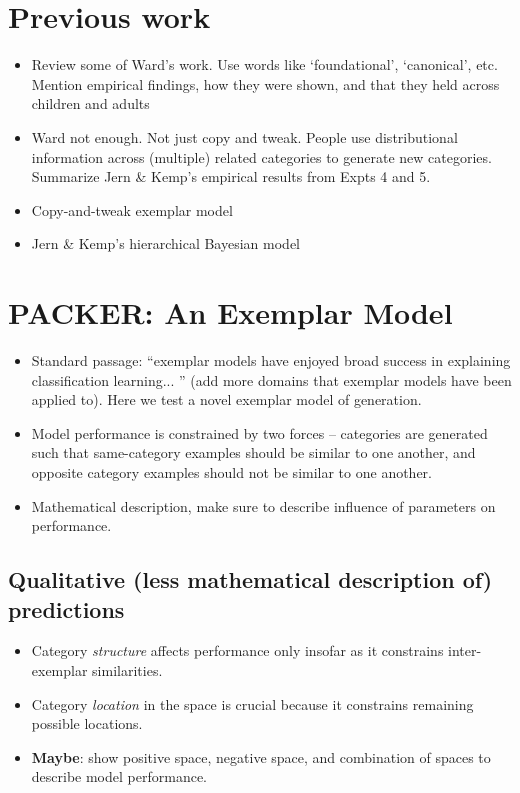 \documentclass[10pt,letterpaper]{article}
\begin{document}
\section{Previous work}
\begin{itemize}
\item Review some of Ward's work. Use words like `foundational', `canonical', etc. Mention empirical findings, how they were shown, and that they held across children and adults
\item Ward not enough. Not just copy and tweak. People use distributional information across (multiple) related categories to generate new categories. Summarize Jern \& Kemp's empirical results from Expts 4 and 5.
\item Copy-and-tweak exemplar model 
\item Jern \& Kemp's hierarchical Bayesian model
\end{itemize}

\section{PACKER: An Exemplar Model}
\begin{itemize}
\item Standard passage: ``exemplar models have enjoyed broad success in explaining classification learning... '' (add more domains that exemplar models have been applied to). Here we test a novel exemplar model of generation. 
\item Model performance is constrained by two forces -- categories are generated such that same-category examples should be similar to one another, and opposite category examples should not be similar to one another.
\item Mathematical description, make sure to describe influence of parameters on performance.
\end{itemize}

\subsection{Qualitative (less mathematical description of) predictions}
\begin{itemize}
\item Category \textit{structure} affects performance only insofar as it constrains inter-exemplar similarities. 
\item Category \textit{location} in the space is crucial because it constrains remaining possible locations.
\item \textbf{Maybe}: show positive space, negative space, and combination of spaces to describe model performance.
\end{itemize}
\end{document}
